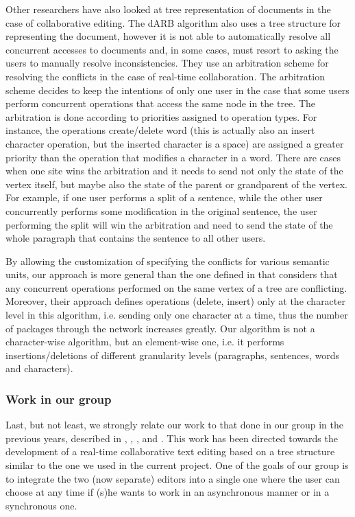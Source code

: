 Other researchers have also looked at tree representation of documents in the case of collaborative
editing. The dARB algorithm \cite{ion00} also uses a tree structure for representing the document,
however it is not able to automatically resolve all concurrent accesses to documents and, in some cases,
must resort to asking the users to manually resolve inconsistencies. They use an arbitration scheme for
resolving the conflicts in the case of real-time collaboration. The arbitration scheme decides to keep
the intentions of only one user in the case that some users perform concurrent operations that access
the same node in the tree. The arbitration is done according to priorities assigned to operation types.
For instance, the operations create/delete word (this is actually also an insert character operation, but
the inserted character is a space) are assigned a greater priority than the operation that modifies a
character in a word. There are cases when one site wins the arbitration and it needs to send not
only the state of the vertex itself, but maybe also the state of the parent or grandparent of the
vertex. For example, if one user performs a split of a sentence, while the other user concurrently
performs some modification in the original sentence, the user performing the split will win the
arbitration and need to send the state of the whole paragraph that contains the sentence to all other
users.

By allowing the customization of specifying the conflicts for various semantic units, our approach
is more general than the one defined in \cite{ion00} that considers that any concurrent operations
performed on the same vertex of a tree are conflicting. Moreover, their approach defines operations
(delete, insert) only at the character level in this algorithm, i.e. sending only one character at a
time, thus the number of packages through the network increases greatly. Our algorithm is not a
character-wise algorithm, but an element-wise one, i.e. it performs insertions/deletions of different
granularity levels (paragraphs, sentences, words and characters).

\subsubsection{Work in our group}

Last, but not least, we strongly relate our work to that done in our group in the previous years,
described in \cite{ignat02}, \cite{ignat03}, \cite{ignat04a}, \cite{ignat04b} and \cite{ned02}.
This work has been directed towards the development of a real-time collaborative text editing
based on a tree structure similar to the one we used in the current project. One of the goals of
our group is to integrate the two (now separate) editors into a single one where the user can choose
at any time if (s)he wants to work in an asynchronous manner or in a synchronous one.


